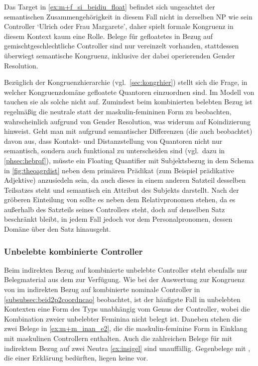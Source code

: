 Das Target  in \cref{ex:m+f_si_beidiu_float} befindet sich
ungeachtet der semantischen Zusammengehörigkeit in diesem Fall nicht in
derselben NP wie sein Controller  `Ulrich
oder Frau Margarete', daher spielt formale Kongruenz in diesem Kontext kaum
eine Rolle. Belege für gefloatetes  in Bezug auf
gemischtgeschlechtliche Controller sind nur vereinzelt vorhanden, stattdessen
überwiegt semantische Kongruenz, inklusive der dabei operierenden Gender
Resolution.

Bezüglich der Kongruenzhierarchie (vgl.~\cref{sec:kongrhier}) stellt sich die
Frage, in welcher Kongruenzdomäne gefloatete Quantoren einzuordnen sind. Im
Modell von \textcites{corbett1979}[84]{wechslerzlatic2003} tauchen sie als
solche nicht auf. Zumindest beim kombinierten belebten Bezug ist regelmäßig die
neutrale statt der maskulin-femininen Form zu beobachten, wahrscheinlich
aufgrund von Gender Resolution, was widerum auf Koindizierung hinweist. Geht
man mit \citet{spector2009} aufgrund semantischer Differenzen (die auch
\cite{pittner1995} beobachtet) davon aus, dass Kontakt- und Distanzstellung von
Quantoren nicht nur semantisch, sondern auch funktional zu unterscheiden sind
(vgl.~dazu in \cref{phsec:hebrqf}), müsste ein Floating Quantifier mit
Subjektsbezug in dem Schema in \cref{fig:theoagrdist} neben dem primären
Prädikat (zum Beispiel prädikative Adjektive) anzusiedeln sein, da auch dieses
in einem anderen Satzteil desselben Teilsatzes steht und semantisch ein
Attribut des Subjekts darstellt. Nach der gröberen Einteilung von
\citet[216]{corbett1979} sollte es neben dem Relativpronomen stehen, da es
außerhalb des Satzteils seines Controllers steht, doch auf denselben Satz
beschränkt bleibt, in jedem Fall jedoch vor dem Personalpronomen, dessen Domäne
über den Satz hinausgeht.%

\subsubsection{Unbelebte kombinierte Controller}

Beim indirekten Bezug auf kombinierte unbelebte Controller steht ebenfalls nur
Belegmaterial aus dem \CAO{} zur Verfügung. Wie bei der Auswertung zur
Kongruenz von  im indirekten Bezug auf kombinierte nominale
Controller in \cref{subsubsec:beid2p2coordncao} beobachtet, ist der häufigste
Fall in unbelebten Kontexten eine Form des Typs  unabhängig vom
Genus der Controller, wobei die Kombination zweier unbelebter Feminina nicht
belegt ist. Daneben stehen die zwei Belege in \cref{ex:m+m_inan_e2}, die die
maskulin-feminine Form  in Einklang mit maskulinen Controllern
enthalten. Auch die zahlreichen Belege für  mit indirektem Bezug
auf zwei Neutra \cref{ex:insigel} sind unauffällig. Gegenbelege mit
, die einer Erklärung bedürften, liegen keine vor.

